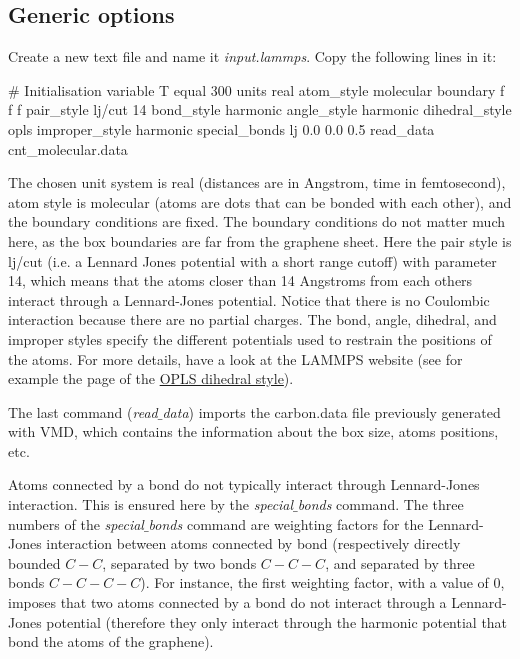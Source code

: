 \subsection{Generic options}

\noindent Create a new text file and name it \textit{input.lammps}. Copy the
following lines in it:

\begin{lcverbatim}
# Initialisation
variable T equal 300
units real
atom_style molecular
boundary f f f
pair_style lj/cut 14
bond_style harmonic
angle_style harmonic
dihedral_style opls
improper_style harmonic
special_bonds lj 0.0 0.0 0.5
read_data cnt_molecular.data
\end{lcverbatim}

\noindent The chosen unit system is real (distances are in Angstrom, time in femtosecond),
atom style is molecular (atoms are dots that can be bonded with each other),
and the boundary conditions are fixed. The boundary conditions
do not matter much here, as the box boundaries are far from the graphene sheet. 
Here the pair style is lj/cut (i.e. a Lennard Jones potential 
with a short range cutoff) with
parameter 14, which means that the atoms closer than 14
Angstroms from each others interact through a Lennard-Jones
potential. Notice that there is no Coulombic interaction
because there are no partial charges.
The bond, angle, dihedral, and improper styles specify the
different potentials used to restrain the positions of the
atoms. For more details, have a look at the LAMMPS website
(see for example the page of the \href{https://lammps.sandia.gov/doc/dihedral_opls.html}{OPLS dihedral style}).

The last command (\textit{read$\_$data}) imports the carbon.data file
previously generated with VMD, which contains the
information about the box size, atoms positions, etc.

\begin{tcolorbox}[colback=mylightblue!5!white,colframe=mylightblue!75!black,title=About interaction between neighbors atoms]
Atoms connected by a bond do not typically interact through
Lennard-Jones interaction. This is ensured here by the
\textit{special$\_$bonds} command. The three numbers of the
\textit{special$\_$bonds} command are weighting factors for the
Lennard-Jones interaction between atoms connected by bond
(respectively directly bounded $C-C$, separated by two bonds $C-C-C$,
and separated by three bonds $C-C-C-C$). For instance, the
first weighting factor, with a
value of 0, imposes that two atoms connected by a bond do
not interact through a Lennard-Jones potential (therefore
they only interact through the harmonic potential that bond the atoms
of the graphene).
\end{tcolorbox}

